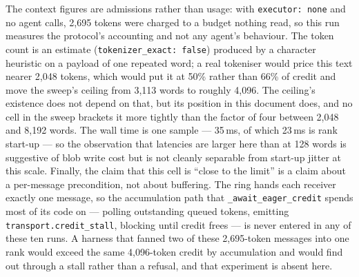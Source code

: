 \documentclass[11pt]{article}
\begin{document}
The context figures are admissions rather than usage: with \texttt{executor: none}
and no agent calls, 2{,}695 tokens were charged to a budget nothing read, so this run
measures the protocol's accounting and not any agent's behaviour. The token count is
an estimate (\texttt{tokenizer\_exact: false}) produced by a character heuristic on a
payload of one repeated word; a real tokeniser would price this text nearer 2{,}048
tokens, which would put it at 50\% rather than 66\% of credit and move the sweep's
ceiling from 3{,}113 words to roughly 4{,}096. The ceiling's existence does not
depend on that, but its position in this document does, and no cell in the sweep
brackets it more tightly than the factor of four between 2{,}048 and 8{,}192 words.
The wall time is one sample --- 35\,ms, of which 23\,ms is rank start-up --- so the
observation that latencies are larger here than at 128 words is suggestive of blob
write cost but is not cleanly separable from start-up jitter at this scale. Finally,
the claim that this cell is ``close to the limit'' is a claim about a per-message
precondition, not about buffering. The ring hands each receiver exactly one message,
so the accumulation path that \texttt{\_await\_eager\_credit} spends most of its code
on --- polling outstanding queued tokens, emitting \texttt{transport.credit\_stall},
blocking until credit frees --- is never entered in any of these ten runs. A harness
that fanned two of these 2{,}695-token messages into one rank would exceed the same
4{,}096-token credit by accumulation and would find out through a stall rather than a
refusal, and that experiment is absent here.
\end{document}
